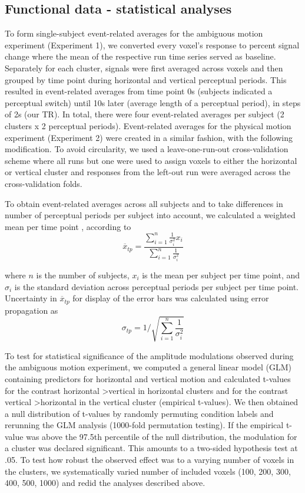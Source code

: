 \subsection{Functional data - statistical analyses}
To form single-subject event-related averages for the ambiguous motion experiment (Experiment 1), we converted every voxel's response to percent signal change where the mean of the respective run time series served as baseline. Separately for each cluster, signals were first averaged across voxels and then grouped by time point during horizontal and vertical perceptual periods. This resulted in event-related averages from time point 0s (subjects indicated a perceptual switch) until 10s later (average length of a perceptual period), in steps of 2s (our TR). In total, there were four event-related averages per subject (2 clusters x 2 perceptual periods). Event-related averages for the physical motion experiment (Experiment 2) were created in a similar fashion, with the following modification. To avoid circularity, we used a leave-one-run-out cross-validation scheme where all runs but one were used to assign voxels to either the horizontal or vertical cluster and responses from the left-out run were averaged across the cross-validation folds.

To obtain event-related averages across all subjects and to take differences in number of perceptual periods per subject into account, we calculated a weighted mean per time point \parencite{Cohen1998}, according to 
\begin{equation}
\overline{x}_{tp} = \frac{\sum\limits_{i=1}^n \frac{1}{\sigma_i^2} x_i}{\sum\limits_{i=1}^n \frac{1}{\sigma_i^2}}
\end{equation}

where $n$ is the number of subjects, $x_i$ is the mean per subject per time point, and $\sigma_i$ is the standard deviation across perceptual periods per subject per time point. Uncertainty in $\overline{x}_{tp}$ for display of the error bars was calculated using error propagation \parencite{Cohen1998} as
\begin{equation}
\sigma_{tp} = 1 / \sqrt{\sum\limits_{i=1}^n \frac{1}{\sigma_i^2}}
\end{equation}

To test for statistical significance of the amplitude modulations observed during the ambiguous motion experiment, we computed a general linear model (GLM) containing predictors for horizontal and vertical motion and calculated t-values for the contrast horizontal \textgreater vertical in horizontal clusters and for the contrast vertical \textgreater horizontal in the vertical cluster (empirical t-values). We then obtained a null distribution of t-values by randomly permuting condition labels and rerunning the GLM analysis (1000-fold permutation testing). If the empirical t-value was above the 97.5th percentile of the null distribution, the modulation for a cluster was declared significant. This amounts to a two-sided hypothesis test at .05. To test how robust the observed effect was to a varying number of voxels in the clusters, we systematically varied number of included voxels (100, 200, 300, 400, 500, 1000) and redid the analyses described above.

